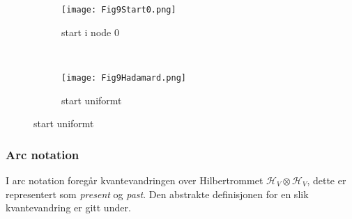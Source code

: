             \begin{figure}
                \begin{center}
                    \caption{Kvantevandring over \ref{fig:Simp graf}}
                    \begin{subfigure}{0.6\textwidth}
                        \begin{center}
                            \caption{start i node $0$}
                            \texttt{[image: Fig9Start0.png]}
                        \end{center}
                    \end{subfigure} \\
                    \begin{subfigure}{0.6\textwidth}
                        \begin{center}
                            \caption{start uniformt}
                            \texttt{[image: Fig9Hadamard.png]}
                        \end{center}
                    \end{subfigure}
                    \label{fig:simp vandring}
                \end{center}
            \end{figure}

        \subsubsection{Arc notation}

            I arc notation foregår kvantevandringen over Hilbertrommet $\mathcal{H}_V\otimes\mathcal{H}_V$, dette er representert som \emph{present} og \emph{past}. Den abstrakte definisjonen for en slik kvantevandring er gitt under.

